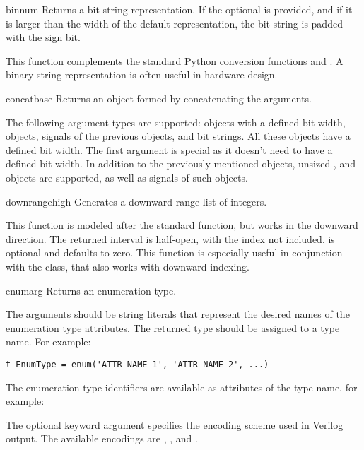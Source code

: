 \begin{funcdesc}{bin}{num }
Returns a bit string representation. If the optional 
is provided, and if it is larger than the width of the default
representation, the bit string is padded with the sign bit.

This function complements the standard Python conversion functions
 and . A binary string representation is often
useful in hardware design.
\end{funcdesc}

\begin{funcdesc}{concat}{base }
Returns an  object formed by concatenating the arguments.

The following argument types are supported:  objects with
a defined bit width,  objects, signals of the previous
objects, and bit strings. All these objects have a defined bit
width. The first argument  is special as it doesn't need to
have a defined bit width. In addition to the previously mentioned
objects, unsized ,  and  objects
are supported, as well as signals of such objects.
\end{funcdesc}

\begin{funcdesc}{downrange}{high }
Generates a downward range list of integers.

This function is modeled after the standard  function, but
works in the downward direction. The returned interval is half-open,
with the  index not included.  is optional and
defaults to zero.  This function is especially useful in conjunction
with the  class, that also works with downward indexing.
\end{funcdesc}

\begin{funcdesc}{enum}{arg  }
Returns an enumeration type.

The arguments should be string literals that represent the desired
names of the enumeration type attributes.  The returned type should be
assigned to a type name.  For example:
\begin{verbatim}
t_EnumType = enum('ATTR_NAME_1', 'ATTR_NAME_2', ...)
\end{verbatim}
The enumeration type identifiers are available as attributes of
the type name, for example: 

The optional keyword argument  specifies the encoding
scheme used in Verilog output. The available encodings are ,
, and .
\end{funcdesc}

